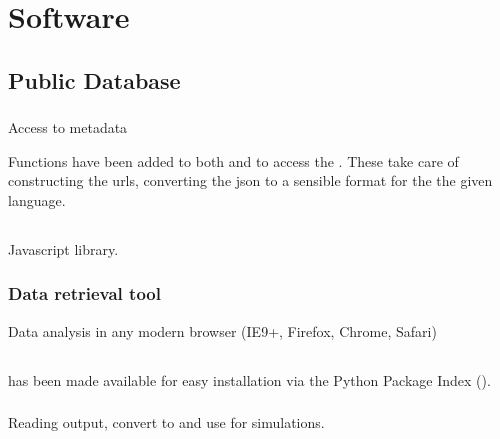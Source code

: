 \chapter{Software}
\label{ch:hisparc-experiment}

\section{\hisparc Public Database}

\subsection{\api}

Access to metadata

Functions have been added to both \sapphire and \jsparc to access the \api.
These take care of constructing the urls, converting the json to a sensible format for the the given language.

\section{\jsparc}

Javascript library.

\subsection{Data retrieval tool}

Data analysis in any modern browser (IE9+, Firefox, Chrome, Safari)


\section{\sapphire}


\subsection{\pypi}

\sapphire has been made available for easy installation via the Python
Package Index (\pypi).


\subsection{\corsika}

Reading \corsika output, convert to \hdf and use for simulations.

